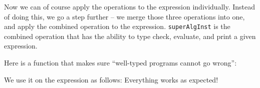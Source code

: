 Now we can of course apply the operations to the expression individually.
Instead of doing this, we go a step further -- we merge those three operations
into one, and apply the combined operation to the expression.
\lstinline{superAlgInst} is the combined operation that has the ability to type
check, evaluate, and print a given expression.

Here is a function that makes sure ``well-typed programs cannot go wrong'':

We use it on the expression as follows:
Everything works as expected!